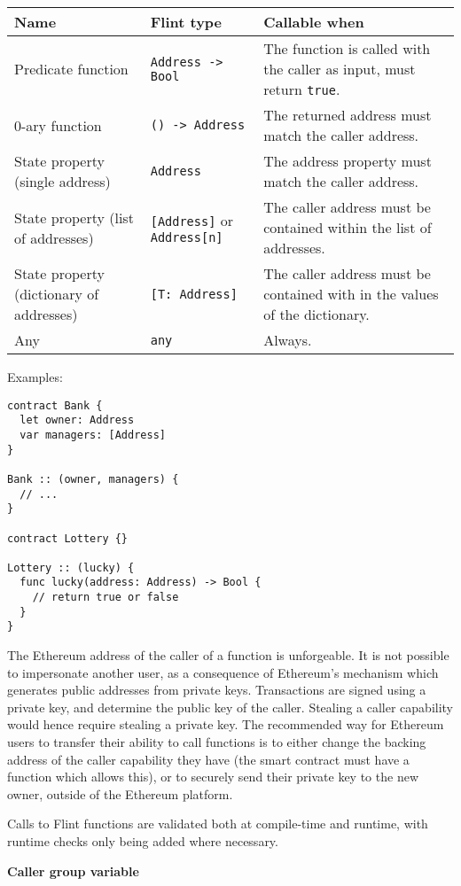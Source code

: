 \begin{tabularx}{\textwidth}{llX}
	Name & Flint type & Callable when\\\hline
	Predicate function & \texttt{Address -> Bool} & The function is called with the caller as input, must return \texttt{true}.\\
	0-ary function & \texttt{() -> Address} & The returned address must match the caller address.\\
	State property (single address) & \texttt{Address} & The address property must match the caller address.\\
	State property (list of addresses) & \texttt{[Address]} or \texttt{Address[n]} & The caller address must be contained within the list of addresses.\\
	State property (dictionary of addresses) & \texttt{[T: Address]} & The caller address must be contained with in the values of the dictionary.\\
	Any & \texttt{any} & Always.
\end{tabularx}

Examples:

\begin{verbatim}
contract Bank {
  let owner: Address
  var managers: [Address]
}

Bank :: (owner, managers) {
  // ...
}

contract Lottery {}

Lottery :: (lucky) {
  func lucky(address: Address) -> Bool {
    // return true or false
  }
}
\end{verbatim}

The Ethereum address of the caller of a function is unforgeable. It is not possible to impersonate another user, as a consequence of Ethereum’s mechanism which generates public addresses from private keys. Transactions are signed using a private key, and determine the public key of the caller. Stealing a caller capability would hence require stealing a private key. The recommended way for Ethereum users to transfer their ability to call functions is to either change the backing address of the caller capability they have (the smart contract must have a function which allows this), or to securely send their private key to the new owner, outside of the Ethereum platform.

Calls to Flint functions are validated both at compile-time and runtime, with runtime checks only being added where necessary.

\textbf{Caller group variable}
\label{sec:appendix-b-caller-group-variable}

